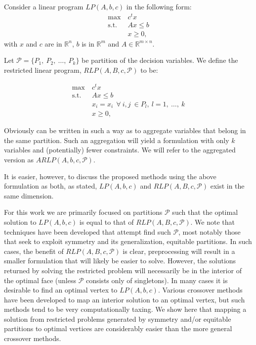 \documentclass[runningheads]{llncs}
\newcommand{\cP}{{\mathcal P}}
\begin{document}




Consider a linear program $LP(A,b,c)$ in the following form:
\begin{align} \label{eq:LP}
  \max \ & c^t x \\
  \mbox{s.t. } & Ax \leq b\\
  & x \geq 0,
  \end{align}
\noindent with  $x$ and  $c$ are in $\mathbb{R}^n$, $b$ is in $\mathbb{R}^m$ and
$A \in \mathbb{R}^{m \times n}$.

Let $\cP = \{P_1,\ P_2,\ \ldots,\ P_k\}$ be partition of the decision variables. We define the restricted
linear program, $RLP(A,B,c,\cP)$ to be:

\begin{align}
  \max \ & c^t x \\
  \mbox{s.t. } & Ax \leq b \label{cons:orig}\\
  & x_i = x_i \ \ \forall\ i,j \ \in P_l,\  l= 1,\ \ldots,\ k \label{cons:equal}\\
  & x \geq 0,
  \end{align}

\noindent Obviously can be written in such a way as to aggregate variables that
belong in the same partition. Such an aggregation will yield a formulation with
only $k$ variables and (potentially) fewer constraints. We will refer to the aggregated version as $ARLP(A,b,c,\cP)$.

 It is easier, however, to
discuss the proposed methods using the above formulation as both, as stated,  $LP(A,b,c)$ and
$RLP(A,B,c,\cP)$ exist in the same dimension.

For this work we are primarily focused on partitions $\cP$ such that the optimal
solution to $LP(A,b,c)$ is equal to that of $RLP(A,B,c,\cP)$. We note that
techniques have been developed that attempt find such $\cP$, most notably those
that seek to exploit symmetry and its generalization, equitable partitions. In
such cases, the benefit of  $RLP(A,B,c,\cP)$ is clear, preprocessing will result
in a smaller formulation that will likely be easier to solve. However, the
solutions returned by solving the restricted problem will necessarily be in the
interior of the optimal face (unless $\cP$ consists only of singletons). In many
cases it is desirable to find an optimal vertex to $LP(A,b,c)$. Various
crossover methods have been developed to map an interior solution to an optimal
vertex, but such methods tend to be very computationally taxing. We show here
that mapping a solution from restricted problems generated by symmetry and/or
equitable partitions to optimal vertices are
considerably easier than the more general crossover methods.
\end{document}
